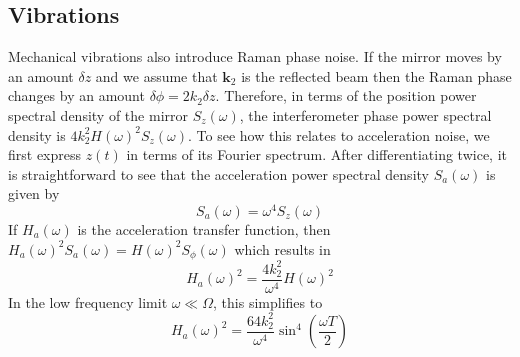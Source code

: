 \subsection{Vibrations}\label{subsec:vibration_noise}
Mechanical vibrations also introduce Raman phase
noise\nocite{Vigue2006}. 
If the mirror moves by an amount $\delta z$ and we assume that
$\textbf{k}_2$ is the reflected beam then the Raman phase changes by
an amount $\delta \phi = 2 k_2 \delta z$. Therefore, in terms
of the position power spectral density of the mirror $S_z
(\omega)$, the interferometer phase power spectral density is
$4 k_\text{2}^2 H(\omega)^2 S_z(\omega)$. To see how this relates to
acceleration noise, we first express $z(t)$ in terms of its Fourier
spectrum. After differentiating twice, it is straightforward to see
that the acceleration power spectral density $S_a(\omega)$ is given by
\begin{equation}
  S_a(\omega) = \omega^4 S_z(\omega) 
\end{equation}
If $H_a(\omega)$ is the acceleration transfer function, then
$H_a(\omega)^2 S_a(\omega) = H(\omega)^2 S_\phi(\omega)$ which
results in
\begin{equation}
  H_a(\omega)^2 = \frac{4k_\text{2}^2}{\omega^4}H(\omega)^2 
  \label{eq:acc_transfer}
\end{equation}
In the low frequency limit \(\omega \ll \Omega\), this simplifies to
\begin{equation}
  H_a(\omega)^2 = \frac{64 k_\text{2}^2}{\omega^4}
  \sin^4\left(\frac{\omega T}{2}\right)
  \label{eq:acc_tf_low}
\end{equation}
